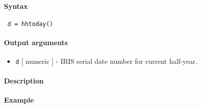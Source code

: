 


	\paragraph{Syntax}
 
 \begin{verbatim}
 d = hhtoday()
 \end{verbatim}
 
 \paragraph{Output arguments}
 
 \begin{itemize}
 \item
   \texttt{d} {[} numeric {]} - IRIS serial date number for current
   half-year.
 \end{itemize}
 
 \paragraph{Description}
 
 \paragraph{Example}


